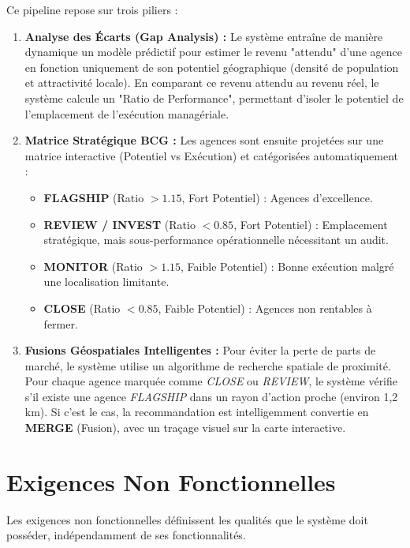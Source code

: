 \documentclass[11pt,a4paper,twoside]{report}
\begin{document}
Ce pipeline repose sur trois piliers :
\begin{enumerate}[leftmargin=1.2cm]
    \item \textbf{Analyse des Écarts (Gap Analysis) :} Le système entraîne de manière dynamique un modèle prédictif pour estimer le revenu "attendu" d'une agence en fonction uniquement de son potentiel géographique (densité de population et attractivité locale). En comparant ce revenu attendu au revenu réel, le système calcule un "Ratio de Performance", permettant d'isoler le potentiel de l'emplacement de l'exécution managériale.
    \item \textbf{Matrice Stratégique BCG :} Les agences sont ensuite projetées sur une matrice interactive (Potentiel vs Exécution) et catégorisées automatiquement :
    \begin{itemize}[leftmargin=1cm]
        \item \textbf{FLAGSHIP} (Ratio $> 1.15$, Fort Potentiel) : Agences d'excellence.
        \item \textbf{REVIEW / INVEST} (Ratio $< 0.85$, Fort Potentiel) : Emplacement stratégique, mais sous-performance opérationnelle nécessitant un audit.
        \item \textbf{MONITOR} (Ratio $> 1.15$, Faible Potentiel) : Bonne exécution malgré une localisation limitante.
        \item \textbf{CLOSE} (Ratio $< 0.85$, Faible Potentiel) : Agences non rentables à fermer.
    \end{itemize}
    \item \textbf{Fusions Géospatiales Intelligentes :} Pour éviter la perte de parts de marché, le système utilise un algorithme de recherche spatiale de proximité. Pour chaque agence marquée comme \textit{CLOSE} ou \textit{REVIEW}, le système vérifie s'il existe une agence \textit{FLAGSHIP} dans un rayon d'action proche (environ 1,2 km). Si c'est le cas, la recommandation est intelligemment convertie en \textbf{MERGE} (Fusion), avec un traçage visuel sur la carte interactive.
\end{enumerate}

\section{Exigences Non Fonctionnelles}

Les exigences non fonctionnelles définissent les qualités que le système doit posséder, indépendamment de ses fonctionnalités.
\end{document}
